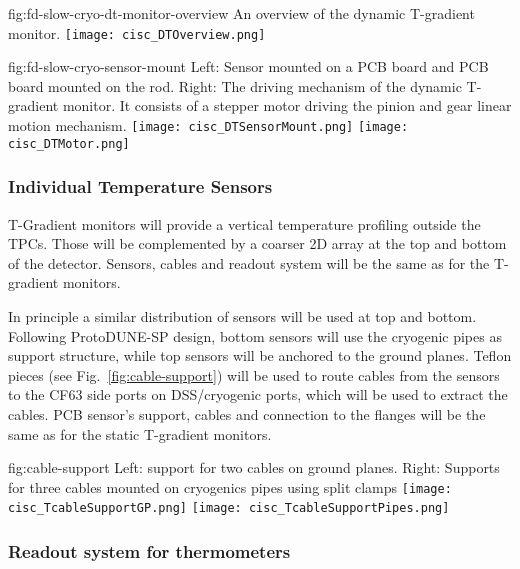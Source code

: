 \begin{dunefigure}{fig:fd-slow-cryo-dt-monitor-overview}
  {An overview of the dynamic T-gradient monitor.}
 \texttt{[image: cisc\_DTOverview.png]}
\end{dunefigure}
\begin{dunefigure}[]{fig:fd-slow-cryo-sensor-mount}
  {Left: Sensor mounted on a PCB board and PCB board mounted on the rod. Right:
    The driving mechanism of the dynamic T-gradient monitor. It consists of a stepper motor driving the pinion and gear linear motion mechanism. }
  \texttt{[image: cisc\_DTSensorMount.png]}
  \hspace{3cm}%
  \texttt{[image: cisc\_DTMotor.png]}
\end{dunefigure}

\subsubsection{Individual Temperature Sensors}

T-Gradient monitors will provide a vertical temperature profiling outside the TPCs. Those will be complemented by a coarser 2D array at the top and bottom of the
detector. Sensors, cables and readout system will be the same as for the T-gradient monitors. 

In principle a similar distribution of sensors will be used at top and bottom.
Following ProtoDUNE-SP design, bottom sensors will use the cryogenic pipes as support structure, while top sensors will be anchored to the ground planes.
Teflon pieces (see Fig.~\ref{fig:cable-support}) will be used to route cables from the sensors to the CF63 side ports on DSS/cryogenic ports, which will be used to extract the cables.
PCB sensor's support, cables and connection to the flanges will be the same as for the static T-gradient monitors. 

\begin{dunefigure}{fig:cable-support}
  {Left: support for two cables on ground planes. Right: Supports for three cables  mounted on cryogenics pipes using split clamps}
  \texttt{[image: cisc\_TcableSupportGP.png]}
  \texttt{[image: cisc\_TcableSupportPipes.png]}
\end{dunefigure}


\subsubsection{Readout system for thermometers}
\label{sec:fdgen-slow-cryo-therm-readout}

